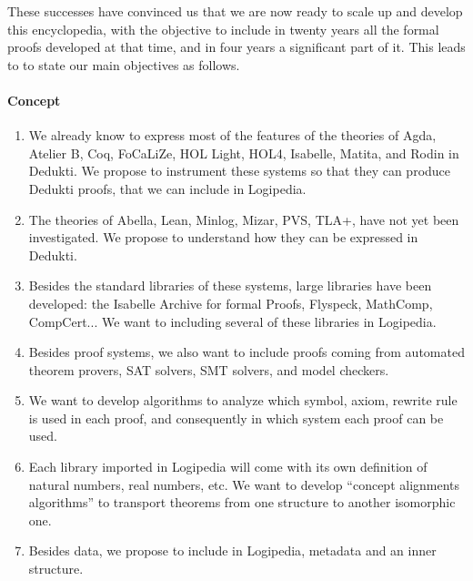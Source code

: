 These successes have convinced us that we are now ready to scale up
and develop this encyclopedia, with the objective to include in twenty
years all the formal proofs developed at that time, and in four years a
significant part of it. This leads to to state our main objectives as
follows.

\paragraph{Concept}

\begin{enumerate}
\item 
  We already know to express most of the features of the theories of 
  {\sc Agda}, {\sc Atelier B}, {\sc Coq}, {\sc FoCaLiZe}, {\sc HOL Light},
  {\sc HOL4}, {\sc Isabelle}, {\sc Matita}, and {\sc Rodin}
  in {\sc Dedukti}. We propose to instrument these systems so that
  they can produce {\sc
 Dedukti} proofs, that we can include in
  {\sc Logipedia}. 

\item
  The theories of {\sc Abella}, {\sc Lean}, {\sc Minlog}, {\sc Mizar},
  {\sc PVS}, {\sc TLA+}, have not yet been investigated. We propose to
  understand how they can be expressed in 
  {\sc Dedukti}. 

\item
  Besides the standard libraries of these systems, large libraries
  have been developed: the 
  Isabelle Archive for formal Proofs, Flyspeck, MathComp, CompCert...
We want to including several of these libraries in {\sc Logipedia}. 
  
\item
  Besides proof systems, we also want to include proofs coming from
  automated theorem provers, SAT solvers, SMT solvers, and model checkers. 

\item
  We want to develop algorithms to analyze which symbol, axiom, rewrite
  rule is used in each proof, and consequently in which system each proof
  can be used.

\item
  Each library imported in {\sc Logipedia} will come with its own
  definition of natural numbers, real numbers, etc. We want to develop
  ``concept alignments algorithms'' to transport theorems from one
  structure to another isomorphic one.

\item 
  Besides data, we propose to include in {\sc Logipedia}, metadata and
  an inner structure.
\end{enumerate}



